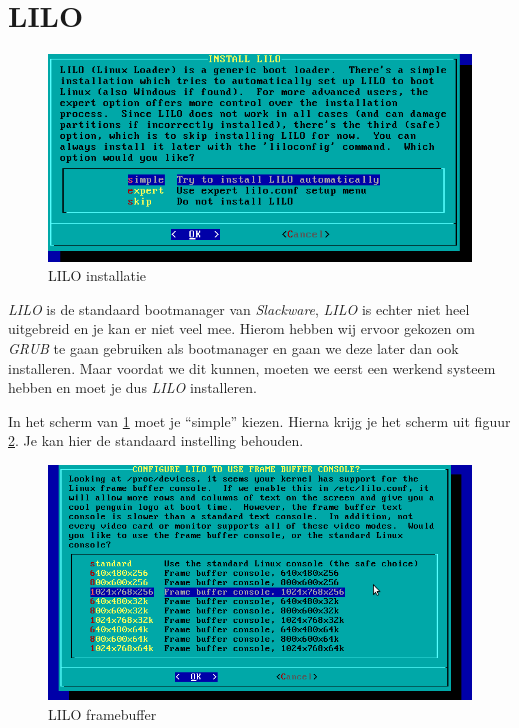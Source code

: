 \section{LILO}
\begin{figure}[H]
  \begin{center}
    \includegraphics[scale=0.5]{images/install_lilo1}
  \end{center}
  \caption{LILO installatie}
  \label{fig:install_lilo1}
\end{figure}
\emph{LILO} is de standaard bootmanager van \emph{Slackware}, \emph{LILO} is echter niet heel uitgebreid en je kan er niet veel mee. Hierom hebben wij ervoor gekozen om \emph{GRUB} te gaan gebruiken als bootmanager en gaan we deze later dan ook installeren. Maar voordat we dit kunnen, moeten we eerst een werkend systeem hebben en moet je dus \emph{LILO} installeren. 

In het scherm van \ref{fig:install_lilo1} moet je ``simple'' kiezen. Hierna krijg je het scherm uit figuur \ref{fig:install_lilo2}. Je kan hier de standaard instelling behouden.

\begin{figure}[H]
  \begin{center}
    \includegraphics[scale=0.5]{images/install_lilo2}
  \end{center}
  \caption{LILO framebuffer}
  \label{fig:install_lilo2}
\end{figure}

